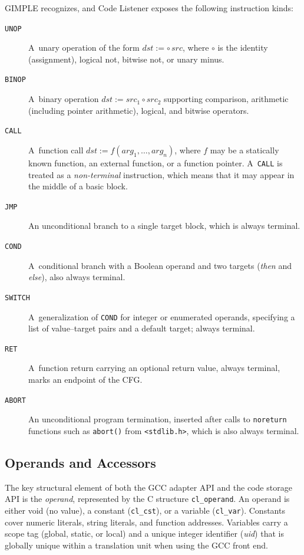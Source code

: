 GIMPLE recognizes, and Code Listener exposes the following instruction kinds:

\begin{description}
  \item[\texttt{UNOP}] A~unary operation of the form $\mathit{dst} := \circ\, \mathit{src}$, where $\circ$ is the identity (assignment), logical not, bitwise not, or unary minus.
  \item[\texttt{BINOP}] A~binary operation $\mathit{dst} := \mathit{src}_1 \circ \mathit{src}_2$ supporting comparison, arithmetic (including pointer arithmetic), logical, and bitwise operators.
  \item[\texttt{CALL}] A~function call $\mathit{dst} := f(\mathit{arg}_1, \ldots, \mathit{arg}_n)$, where $f$ may be a statically known function, an external function, or a function pointer. A~\texttt{CALL} is treated as a \emph{non-terminal} instruction, which means that it may appear in the middle of a basic block.
  \item[\texttt{JMP}] An unconditional branch to a single target block, which is always terminal.
  \item[\texttt{COND}] A~conditional branch with a Boolean operand and two targets (\emph{then} and \emph{else}), also always terminal.
  \item[\texttt{SWITCH}] A~generalization of \texttt{COND} for integer or enumerated operands, specifying a list of value--target pairs and a default target; always terminal.
  \item[\texttt{RET}] A~function return carrying an optional return value, always terminal, marks an endpoint of the CFG.
  \item[\texttt{ABORT}] An unconditional program termination, inserted after calls to \texttt{noreturn} functions such as \texttt{abort()} from \texttt{<stdlib.h>}, which is also always terminal.
\end{description}

\subsection{Operands and Accessors}

The key structural element of both the GCC adapter API and the code storage API is the \emph{operand}, represented by the C structure \texttt{cl\_operand}. An operand is either void (no value), a constant (\texttt{cl\_cst}), or a variable (\texttt{cl\_var}). Constants cover numeric literals, string literals, and function addresses. Variables carry a scope tag (global, static, or local) and a unique integer identifier (\emph{uid}) that is globally unique within a translation unit when using the GCC front end.


